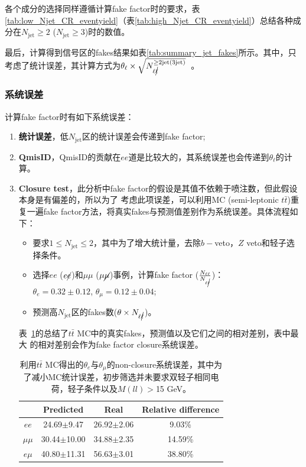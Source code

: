 各个成分的选择同样遵循计算fake factor时的要求，表\ref{tab:low_Njet_CR_eventyield}（表\ref{tab:high_Njet_CR_eventyield}）总结各种成分在$N_{\text{jet}}\ge2$ ($N_{\text{jet}}\ge3$)时的数值。


最后，计算得到信号区的fakes结果如表\ref{tab:summary_jet_fakes}所示。其中，只考虑了统计误差，其计算方式为$\theta_{\ell}\times \sqrt{N_{\ell\cancel{\ell}}^{\geq \text{2jet(3jet)}}}$~\cite{Alison2015}。


\subsubsection{系统误差}
计算fake factor时有如下系统误差：
\begin{enumerate}
  \item \textbf{统计误差}，低$N_{\text{jet}}$区的统计误差会传递到fake factor;
  \item \textbf{QmisID}，QmisID的贡献在$ee$道是比较大的，其系统误差也会传递到$\theta_{\ell}$的计算。
  \item \textbf{Closure test}，此分析中fake factor的假设是其值不依赖于喷注数，但此假设本身是有偏差的，所以为了
考虑此项误差，可以利用MC (semi-leptonic $t\bar{t}$)重复一遍fake factor方法，将真实fakes与预测值差别作为系统误差。具体流程如下：
  \begin{itemize}
   \item 要求$1\leq N_{\text{jet}}\leq2$，其中为了增大统计量，去除$b-$veto，$Z$ veto和轻子\pt 选择条件。
   \item 选择$ee$ ($e\cancel{e}$)和$\mu\mu$ ($\mu\cancel{\mu}$)事例，计算fake factor ($\frac{N_{\ell\ell}}{N_{\ell\cancel{\ell}}}$)：\\
   $\theta_{e}=0.32\pm0.12$, $\theta_{\mu}=0.12\pm0.04$;
   \item 预测高$N_{\text{jet}}$区的fakes数($\theta \times N_{\ell\cancel{\ell}}$)。
  \end{itemize}
表~\ref{tab:nonclosure_ttbar}的总结了$t\bar{t}$ MC中的真实fakes，预测值以及它们之间的相对差别，表中最大
的相对差别会作为fake factor closure系统误差。
\begin{table}[h]
\centering
\begin{tabular}{c|ccc}
   &Predicted  &Real   &Relative difference  \\
\hline
$ee$   &24.69$\pm$9.47  &26.92$\pm$2.06 &9.03\% \\
$\mu\mu$ &30.44$\pm$10.00 &34.88$\pm$2.35 &14.59\% \\
$e\mu$   &40.80$\pm$11.31  &56.63$\pm$3.01  &38.80\% \\
\hline
\end{tabular}
\caption{利用$t\bar{t}$ MC得出的$\theta_{e}$与$\theta_{\mu}$的non-closure系统误差，其中为了减小MC统计误差，初步筛选并未要求双轻子相同电荷，轻子\pt 条件以及$M(ll)>$15 GeV。}
\label{tab:nonclosure_ttbar}
\end{table}


\end{enumerate}
